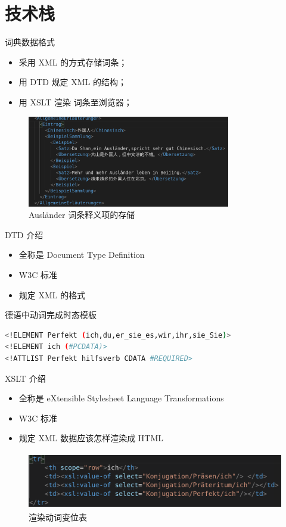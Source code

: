\documentclass[notheorems,xetex]{beamer}
\begin{document}
\section{技术栈}
\frame{\tableofcontents[currentsection]}
\begin{frame}{词典数据格式}
\begin{itemize}
\item 采用 XML 的方式存储词条；
\item 用 DTD 规定 XML 的结构；
\item 用 XSLT 渲染 词条至浏览器；
\end{itemize}
\begin{figure}
	\includegraphics[height=4cm]{xml.png}
	\caption{Ausländer 词条释义项的存储}
\end{figure}

\end{frame}
\begin{frame}[fragile]{DTD 介绍}
\begin{itemize}
	\item 全称是 Document Type Definition
	\item W3C 标准
	\item 规定 XML 的格式
\end{itemize}
\begin{block}{德语中动词完成时态模板}
\begin{lstlisting}[language=bash]
<!ELEMENT Perfekt (ich,du,er_sie_es,wir,ihr,sie_Sie)>
<!ELEMENT ich (#PCDATA)>
<!ATTLIST Perfekt hilfsverb CDATA #REQUIRED>
\end{lstlisting}
\end{block}
\end{frame}
\begin{frame}{XSLT 介绍}
\begin{itemize}
	\item 全称是 eXtensible Stylesheet Language Transformations
	\item W3C 标准
	\item 规定 XML 数据应该怎样渲染成 HTML
\end{itemize}
\begin{figure}
	\centering
	\includegraphics[height=2.5cm]{conjugation.png}
	\caption{渲染动词变位表}
\end{figure}
\end{frame}
\end{document}
